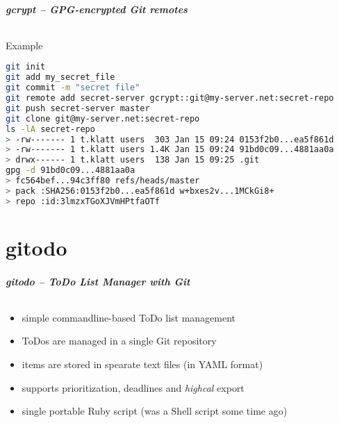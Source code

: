\documentclass[english,hyperref={pdfpagelabels=false},aspectratio=169]{beamer}
\begin{document}
\begin{frame}[fragile]
  \frametitle{gcrypt -- GPG-encrypted Git remotes}
  \framesubtitle{}
  \begin{block}{Example}
    \vspace{-0.75em}
    \begin{lstlisting}[language=zsh]
git init
git add my_secret_file
git commit -m "secret file"
git remote add secret-server gcrypt::git@my-server.net:secret-repo
git push secret-server master
git clone git@my-server.net:secret-repo
ls -lA secret-repo
> -rw------- 1 t.klatt users  303 Jan 15 09:24 0153f2b0...ea5f861d
> -rw------- 1 t.klatt users 1.4K Jan 15 09:24 91bd0c09...4881aa0a
> drwx------ 1 t.klatt users  138 Jan 15 09:25 .git
gpg -d 91bd0c09...4881aa0a
> fc564bef...94c3ff80 refs/heads/master
> pack :SHA256:0153f2b0...ea5f861d w+bxes2v...1MCkGi8+
> repo :id:3lmzxTGoXJVmHPtfaOTf
    \end{lstlisting}
    \vspace{-0.75em}
  \end{block}
\end{frame}


\part{gitodo}
\makepart

\begin{frame}[label=gitodo]
  \frametitle{gitodo -- ToDo List Manager with Git}
  \framesubtitle{}
  \begin{itemize}
    \item simple commandline-based ToDo list management
    \item ToDos are managed in a single Git repository
    \item items are stored in spearate text files {\scriptsize\color{fzjgray50}(in YAML format)}
    \item supports prioritization, deadlines and \textit{highcal} export
    \item single portable Ruby script {\scriptsize\color{fzjgray50}(was a Shell script some time ago)}
  \end{itemize}
\end{frame}
\end{document}
